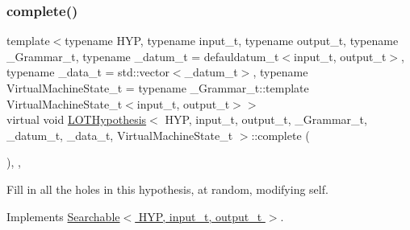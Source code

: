 \mbox{\label{class_l_o_t_hypothesis_a7f913b702b434003f94a84c560d16bf9}} 
\subsubsection{\texorpdfstring{complete()}{complete()}}
{\footnotesize\ttfamily template$<$typename H\+YP, typename input\+\_\+t, typename output\+\_\+t, typename \+\_\+\+Grammar\+\_\+t, typename \+\_\+datum\+\_\+t = defauldatum\+\_\+t$<$input\+\_\+t, output\+\_\+t$>$, typename \+\_\+data\+\_\+t = std\+::vector$<$\+\_\+datum\+\_\+t$>$, typename Virtual\+Machine\+State\+\_\+t = typename \+\_\+\+Grammar\+\_\+t\+::template Virtual\+Machine\+State\+\_\+t$<$input\+\_\+t, output\+\_\+t$>$$>$ \\
virtual void \hyperlink{class_l_o_t_hypothesis}{L\+O\+T\+Hypothesis}$<$ H\+YP, input\+\_\+t, output\+\_\+t, \+\_\+\+Grammar\+\_\+t, \+\_\+datum\+\_\+t, \+\_\+data\+\_\+t, Virtual\+Machine\+State\+\_\+t $>$\+::complete (\begin{DoxyParamCaption}{ }\end{DoxyParamCaption})\hspace{0.3cm}{\ttfamily [inline]}, {\ttfamily [override]}, {\ttfamily [virtual]}}



Fill in all the holes in this hypothesis, at random, modifying self. 



Implements \hyperlink{class_searchable_a3ae6263b49a0f9da94f5dcc23af6618e}{Searchable$<$ H\+Y\+P, input\+\_\+t, output\+\_\+t $>$}.

\mbox{\label{class_l_o_t_hypothesis_af215c4833e81984364703b2e4cb78dc7}} 
